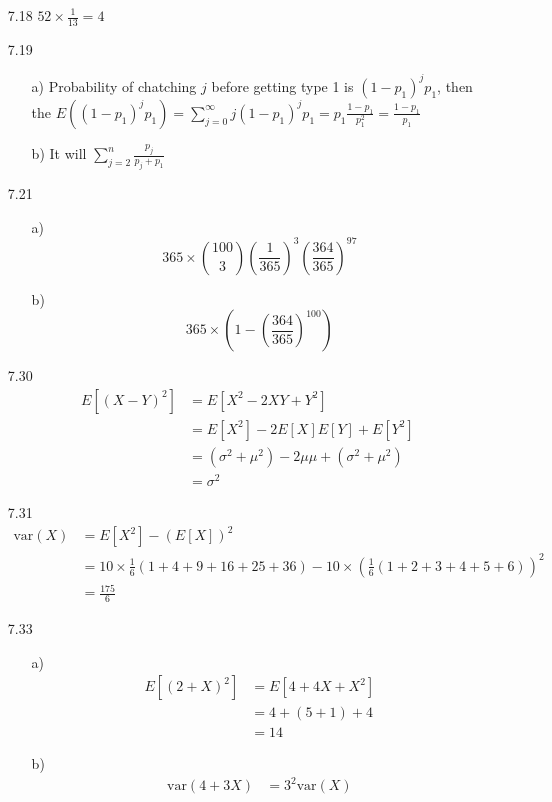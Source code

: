 \documentclass{article}
\begin{document}
\begin{itemize}
    \item [7.18]
    \(52\times \frac{1}{13}=4\)
    \item [7.19]
    \begin{itemize}
        \item [a)]Probability of chatching \(j\) before getting type 1 is \((1-p_1)^jp_1\), then the \(E((1-p_1)^jp_1)=\sum_{j=0}^{\infty}j(1-p_1)^jp_1=p_1\frac{1-p_1}{p_1^2}=\frac{1-p_1}{p_1}\)
        \item [b)]It will \(\sum_{j=2}^{n}\frac{p_j}{p_j+p_1}\)
    \end{itemize}
    \item [7.21]
    \begin{itemize}
        \item [a)]\[365\times \binom{100}{3}\left(\frac{1}{365}\right)^3\left(\frac{364}{365}\right)^{97}\]
        \item [b)]\[365 \times \left(1-\left(\frac{364}{365}\right)^{100}\right)\]
    \end{itemize}
    \item [7.30]
    \begin{align*}
        E\left[\left(X-Y\right)^2\right]&=E\left[X^2-2XY+Y^2\right]\\
        &=E\left[X^2\right]-2E\left[X\right]E\left[Y\right]+E[Y^2]\\
        &=(\sigma^2+\mu^2)-2\mu\mu+(\sigma^2+\mu^2)\\
        &=\sigma^2
    \end{align*}
    \item [7.31]
    \begin{align*}
        \text{var}(X) &= E[X^2]-(E[X])^2\\
        &=10\times \frac{1}{6}(1+4+9+16+25+36)-10\times( \frac{1}{6}(1+2+3+4+5+6))^2\\
        &=\frac{175}{6}
    \end{align*}
    \item [7.33]
    \begin{itemize}
        \item [a)]    
        \begin{align*}
            E\left[(2+X)^2\right]&= E[4+4X+X^2]\\
            &=4+(5+1)+4\\
            &=14
        \end{align*}
        \item [b)]
        \begin{align*}
            \text{var}(4+3X)&=3^2\text{var}(X)\\

\end{align*}
\end{itemize}
\end{itemize}
\end{document}
